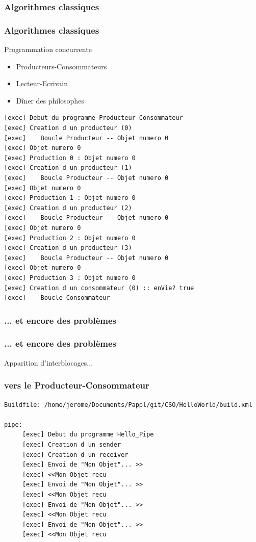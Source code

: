 \documentclass[slidetop,11pt]{beamer}
\begin{document}
\subsubsection{Algorithmes classiques}
\begin{frame} 
\frametitle{Algorithmes classiques}
\begin{block}{Programmation concurrente}
\begin{itemize}[<+->]
\item Producteurs-Consommateurs
\item Lecteur-Ecrivain
\item D\^iner des philosophes
\end{itemize}
\end{block}
\end{frame}

\begin{frame} [containsverbatim]
\begin{lstlisting}[frame=trBL]
[exec] Debut du programme Producteur-Consommateur
[exec] Creation d un producteur (0)
[exec]    Boucle Producteur -- Objet numero 0
[exec] Objet numero 0
[exec] Production 0 : Objet numero 0
[exec] Creation d un producteur (1)
[exec]    Boucle Producteur -- Objet numero 0
[exec] Objet numero 0
[exec] Production 1 : Objet numero 0
[exec] Creation d un producteur (2)
[exec]    Boucle Producteur -- Objet numero 0
[exec] Objet numero 0
[exec] Production 2 : Objet numero 0
[exec] Creation d un producteur (3)
[exec]    Boucle Producteur -- Objet numero 0
[exec] Objet numero 0
[exec] Production 3 : Objet numero 0
[exec] Creation d un consommateur (0) :: enVie? true
[exec]    Boucle Consommateur
\end{lstlisting}
\end{frame}

\subsubsection{... et encore des problèmes}
\begin{frame} 
\frametitle{... et encore des problèmes}
\begin{center}
Apparition d'interblocages...
\end{center}
\end{frame}

\begin{frame} [containsverbatim]
\frametitle{vers le Producteur-Consommateur}
\begin{lstlisting}[frame=trBL]
Buildfile: /home/jerome/Documents/Pappl/git/CSO/HelloWorld/build.xml

pipe:
     [exec] Debut du programme Hello_Pipe
     [exec] Creation d un sender
     [exec] Creation d un receiver
     [exec] Envoi de "Mon Objet"... >>
     [exec] <<Mon Objet recu
     [exec] Envoi de "Mon Objet"... >>
     [exec] <<Mon Objet recu
     [exec] Envoi de "Mon Objet"... >>
     [exec] <<Mon Objet recu
     [exec] Envoi de "Mon Objet"... >>
     [exec] <<Mon Objet recu
\end{lstlisting}
\end{frame}
\end{document}
